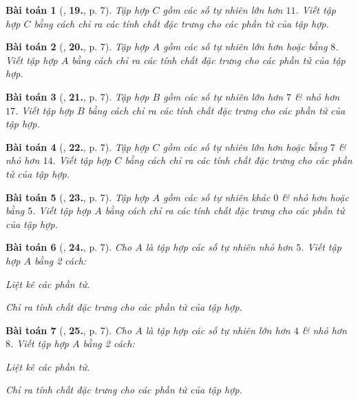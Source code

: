 \documentclass{article}
\numberwithin{equation}{section}
\newtheorem{baitoan}{Bài toán}[section]
\begin{document}
\begin{baitoan}[\cite{Trong_Toan_6_2021}, \textbf{19.}, p. 7]
	Tập hợp $C$ gồm các số tự nhiên lớn hơn $11$. Viết tập hợp $C$ bằng cách chỉ ra các tính chất đặc trưng cho các phần tử của tập hợp.
\end{baitoan}

\begin{baitoan}[\cite{Trong_Toan_6_2021}, \textbf{20.}, p. 7]
	Tập hợp $A$ gồm các số tự nhiên lớn hơn hoặc bằng $8$. Viết tập hợp $A$ bằng cách chỉ ra các tính chất đặc trưng cho các phần tử của tập hợp.
\end{baitoan}

\begin{baitoan}[\cite{Trong_Toan_6_2021}, \textbf{21.}, p. 7]
	Tập hợp $B$ gồm các số tự nhiên lớn hơn $7$ \& nhỏ hơn $17$. Viết tập hợp $B$ bằng cách chỉ ra các tính chất đặc trưng cho các phần tử của tập hợp.
\end{baitoan}

\begin{baitoan}[\cite{Trong_Toan_6_2021}, \textbf{22.}, p. 7]
	Tập hợp $C$ gồm các số tự nhiên lớn hơn hoặc bằng $7$ \& nhỏ hơn $14$. Viết tập hợp $C$ bằng cách chỉ ra các tính chất đặc trưng cho các phần tử của tập hợp.
\end{baitoan}

\begin{baitoan}[\cite{Trong_Toan_6_2021}, \textbf{23.}, p. 7]
	Tập hợp $A$ gồm các số tự nhiên khác $0$ \& nhỏ hơn hoặc bằng $5$. Viết tập hợp $A$ bằng cách chỉ ra các tính chất đặc trưng cho các phần tử của tập hợp.
\end{baitoan}

\begin{baitoan}[\cite{Trong_Toan_6_2021}, \textbf{24.}, p. 7]
	Cho $A$ là tập hợp các số tự nhiên nhỏ hơn $5$. Viết tập hợp $A$ bằng 2 cách:
	\begin{enumerate*}
		\item Liệt kê các phần tử.
		\item Chỉ ra tính chất đặc trưng cho các phần tử của tập hợp.
	\end{enumerate*}
\end{baitoan}

\begin{baitoan}[\cite{Trong_Toan_6_2021}, \textbf{25.}, p. 7]
	Cho $A$ là tập hợp các số tự nhiên lớn hơn $4$ \& nhỏ hơn $8$. Viết tập hợp $A$ bằng 2 cách:
	\begin{enumerate*}
		\item Liệt kê các phần tử.
		\item Chỉ ra tính chất đặc trưng cho các phần tử của tập hợp.
	\end{enumerate*}
\end{baitoan}
\end{document}
